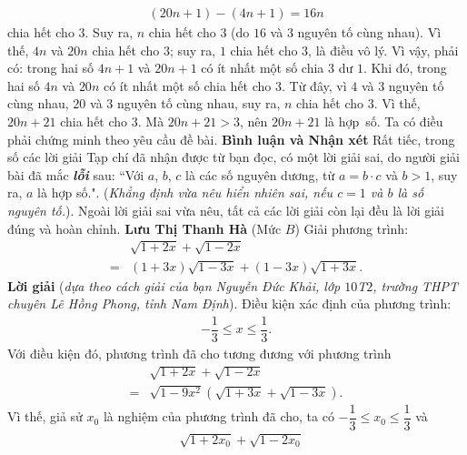 \begin{multicols}{2}
	\begin{align*}
		(20n + 1) - (4n + 1) = 16n
	\end{align*}
	chia hết cho $3$. Suy ra, $n$ chia hết cho $3$ (do $16$ và $3$ nguyên tố cùng nhau). Vì thế, $4n$ và $20n$ chia hết cho $3$; suy ra, $1$ chia hết cho $3$, là điều vô lý. Vì vậy, phải có: trong hai số $4n + 1$ và $20n + 1$ có ít nhất một số chia $3$ dư $1$. Khi đó, trong hai số $4n$ và $20n$ có ít nhất một số chia hết cho $3$. Từ đây, vì $4$ và $3$ nguyên tố cùng nhau, $20$ và $3$ nguyên tố cùng nhau, suy ra, $n$ chia hết cho $3$. Vì thế, $20n + 21$ chia hết cho $3$. Mà $20n + 21 > 3$, nên $20n + 21$ là hợp~số.
	\vskip 0.05cm
	Ta có điều phải chứng minh theo yêu cầu đề bài.
	\vskip 0.05cm
	\textbf{\color{thachthuctoanhoc}Bình luận và Nhận xét}
	\vskip 0.05cm
	Rất tiếc, trong số các lời giải Tạp chí đã nhận được từ bạn đọc, có một lời giải sai, do người giải bài đã mắc \textbf{\color{thachthuctoanhoc}\textit{lỗi}} sau: ``Với $a$, $b$, $c$ là các số nguyên dương, từ  $a = b \cdot c$ và $b > 1$, suy ra, $a$ là hợp số.". (\textit{Khẳng định vừa nêu hiển nhiên sai, nếu $c = 1$ và $b$ là số nguyên tố.}). Ngoài lời giải sai vừa nêu, tất cả các lời giải còn lại đều là lời giải đúng và hoàn chỉnh.
	\vskip 0.05cm
	\hfill	\textbf{\color{thachthuctoanhoc}Lưu Thị Thanh Hà}
	\vskip 0.05cm
	{}
	(Mức $B$) Giải phương trình:
	\begin{align*}
		&\sqrt{1+2 x}+\sqrt{1-2 x}\\
		=&(1+3 x) \sqrt{1-3 x}+(1-3 x) \sqrt{1+3 x}.
	\end{align*}
	\textbf{\color{thachthuctoanhoc}Lời giải} (\textit{dựa theo cách giải của bạn Nguyễn Đức Khải, lớp $10$T$2$, trường THPT chuyên Lê Hồng Phong, tỉnh Nam Định}).
	\vskip 0.05cm
	Điều kiện xác định của phương trình:
	\begin{align*}
		-\dfrac{1}{3} \le x \le \dfrac{1}{3}.
	\end{align*}
	Với điều kiện đó, phương trình đã cho tương đương với phương trình
	\begin{align*}
		&\sqrt {1 + 2x}  + \sqrt {1 - 2x}  \\
		= &\sqrt {1 - 9{x^2}} \left( {\sqrt {1 + 3x}  + \sqrt {1 - 3x} } \right).
	\end{align*}
	Vì thế, giả sử $x_0$  là nghiệm của phương trình đã cho, ta có $ - \dfrac{1}{3} \le {x_0} \le \dfrac{1}{3}$  và
	\begin{align*}
		&\sqrt {1 + 2{x_0}}  + \sqrt {1 - 2{x_0}}  \\

\end{align*}
\end{multicols}
